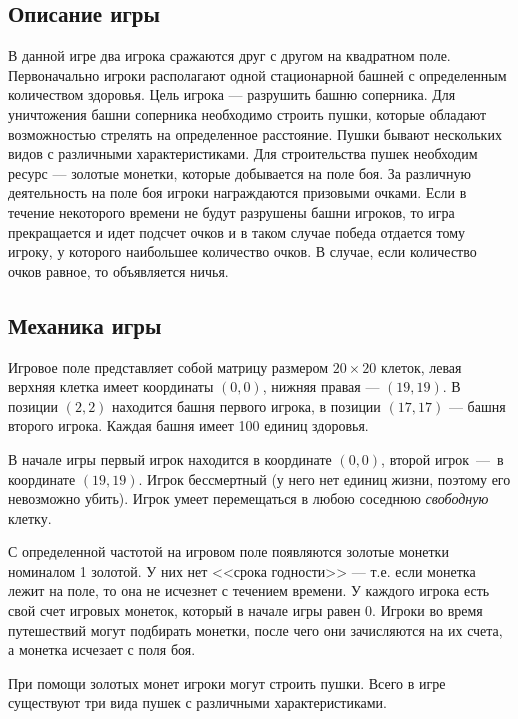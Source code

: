 
\subsection*{Описание игры}
В данной игре два игрока сражаются друг с другом на квадратном поле. Первоначально игроки располагают одной стационарной башней с определенным количеством здоровья. Цель игрока --- разрушить башню соперника. Для уничтожения башни соперника необходимо строить пушки, которые обладают возможностью стрелять на определенное расстояние. Пушки бывают нескольких видов с различными характеристиками. Для строительства пушек необходим ресурс --- золотые монетки, которые добывается на поле боя. За различную деятельность на поле боя игроки награждаются призовыми очками. Если в течение некоторого времени не будут разрушены башни игроков, то игра прекращается и идет подсчет очков и в таком случае победа отдается тому игроку, у которого наибольшее количество очков. В случае, если количество очков равное, то объявляется ничья.

\subsection*{Механика игры}
Игровое поле представляет собой матрицу размером $20 \times 20$ клеток, левая верхняя клетка имеет координаты $(0, 0)$, нижняя правая --- $(19, 19)$. В позиции $(2, 2)$ находится башня первого игрока, в позиции $(17, 17)$ --- башня второго игрока. Каждая башня имеет 100 единиц здоровья.

В начале игры первый игрок находится в координате $(0, 0)$, второй игрок~---~в координате $(19, 19)$. Игрок бессмертный (у него нет единиц жизни, поэтому его невозможно убить). Игрок умеет перемещаться в любою соседнюю \emph{свободную} клетку.

С определенной частотой на игровом поле появляются золотые монетки номиналом 1 золотой. У них нет <<срока годности>> --- т.е. если монетка лежит на поле, то она не исчезнет с течением времени. У каждого игрока есть свой счет игровых монеток, который в начале игры равен 0. Игроки во время путешествий могут подбирать монетки, после чего они зачисляются на их счета, а монетка исчезает с поля боя. 

При помощи золотых монет игроки могут строить пушки. Всего в игре существуют три вида пушек с различными характеристиками. 

